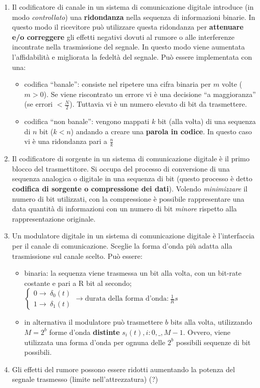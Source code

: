 \documentclass[
]{article}
\begin{document}
\begin{enumerate}
\def\labelenumi{\arabic{enumi}.}
\setcounter{enumi}{42}
\item
  Il codificatore di canale in un sistema di comunicazione digitale
  introduce (in modo \emph{controllato}) una \textbf{ridondanza} nella
  sequenza di informazioni binarie. In questo modo il ricevitore può
  utilizzare questa ridondanza per \textbf{attenuare e/o correggere} gli
  effetti negativi dovuti al rumore o alle interferenze incontrate nella
  trasmissione del segnale. In questo modo viene aumentata
  l'affidabilità e migliorata la fedeltà del segnale. Può essere
  implementata con una:

  \begin{itemize}
  \item
    codifica ``banale'': consiste nel ripetere una cifra binaria per
    \(m\) volte (\(m>0\)). Se viene riscontrato un errore vi è una
    decisione ``a maggioranza'' (se errori
    \(\displaystyle < \frac{N}{2}\)). Tuttavia vi è un numero elevato di
    bit da trasmettere.
  \item
    codifica ``non banale'': vengono mappati \(k\) bit (alla volta) di
    una sequenza di \(n\) bit (\(k<n\)) andando a creare una
    \textbf{parola in codice}. In questo caso vi è una ridondanza pari a
    \(\frac{n}{k}\)
  \end{itemize}
\item
  Il codificatore di sorgente in un sistema di comunicazione digitale è
  il primo blocco del trasmettitore. Si occupa del processo di
  conversione di una sequenza analogica o digitale in una sequenza di
  bit (questo processo è detto \textbf{codifica di sorgente o
  compressione dei dati}). Volendo \emph{minimizzare} il numero di bit
  utilizzati, con la compressione è possibile rappresentare una data
  quantità di informazioni con un numero di bit \emph{minore} rispetto
  alla rappresentazione originale.
\item
  Un modulatore digitale in un sistema di comunicazione digitale è
  l'interfaccia per il canale di comunicazione. Sceglie la forma d'onda
  più adatta alla trasmissione sul canale scelto. Può essere:

  \begin{itemize}
  \item
    binaria: la sequenza viene trasmessa un bit alla volta, con un
    bit-rate costante e pari a R bit al secondo;
    \(\left\{ \begin{array}{cl}0 \to \ \delta_0(t)\\1 \to \ \delta_1(t)\end{array} \right.\to \text{durata della forma d'onda}: \frac{1}{R}s\)\\
  \item
    in alternativa il modulatore può trasmettere \(b\) bits alla volta,
    utilizzando \(M=2^b\) forme d'onda \textbf{distinte}
    \(s_i(t), i:0, \_, M-1\). Ovvero, viene utilizzata una forma d'onda
    per ognuna delle \(2^b\) possibili sequenze di bit possibili.
  \end{itemize}
\item
  Gli effetti del rumore possono essere ridotti aumentando la potenza
  del segnale trasmesso (limite nell'attrezzatura) (?)
\end{enumerate}
\end{document}
